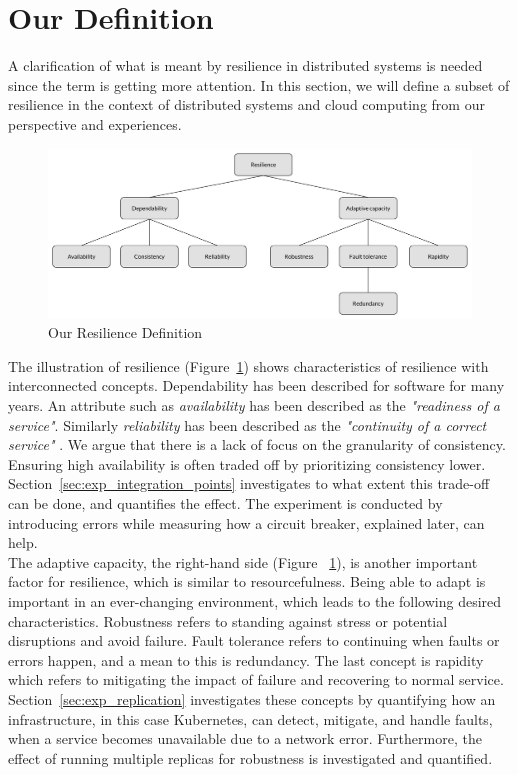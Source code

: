 \section{Our Definition}
A clarification of what is meant by resilience in distributed systems is needed since the term is getting more attention. In this section, we will define a subset of resilience in the context of distributed systems and cloud computing from our perspective and experiences.

\begin{figure}[H]
    \centering
    \includegraphics[width=\textwidth]{figures/our_resilience}
    \caption{Our Resilience Definition}
    \label{fig:our_resilience_definition}
\end{figure}

\noindent The illustration of resilience (Figure~\ref{fig:our_resilience_definition}) shows characteristics of resilience with interconnected concepts. Dependability has been described for software for many years. An attribute such as \textit{availability} has been described as the \textit{"readiness of a service"}. Similarly \textit{reliability} has been described as the \textit{"continuity of a correct service"} \cite[p. 2]{Laprie1995}. We argue that there is a lack of focus on the granularity of consistency. Ensuring high availability is often traded off by prioritizing consistency lower. Section~\ref{sec:exp_integration_points} investigates to what extent this trade-off can be done, and quantifies the effect. The experiment is conducted by introducing errors while measuring how a circuit breaker, explained later, can help. \\

\noindent
The adaptive capacity, the right-hand side (Figure~
\ref{fig:our_resilience_definition}), is another important factor for resilience, which is similar to resourcefulness. Being able to adapt is important in an ever-changing environment, which leads to the following desired characteristics. Robustness refers to standing against stress or potential disruptions and avoid failure. Fault tolerance refers to continuing when faults or errors happen, and a mean to this is redundancy. The last concept is rapidity which refers to mitigating the impact of failure and recovering to normal service. Section~\ref{sec:exp_replication} investigates these concepts by quantifying how an infrastructure, in this case Kubernetes, can detect, mitigate, and handle faults, when a service becomes unavailable due to a network error. Furthermore, the effect of running multiple replicas for robustness is investigated and quantified.


